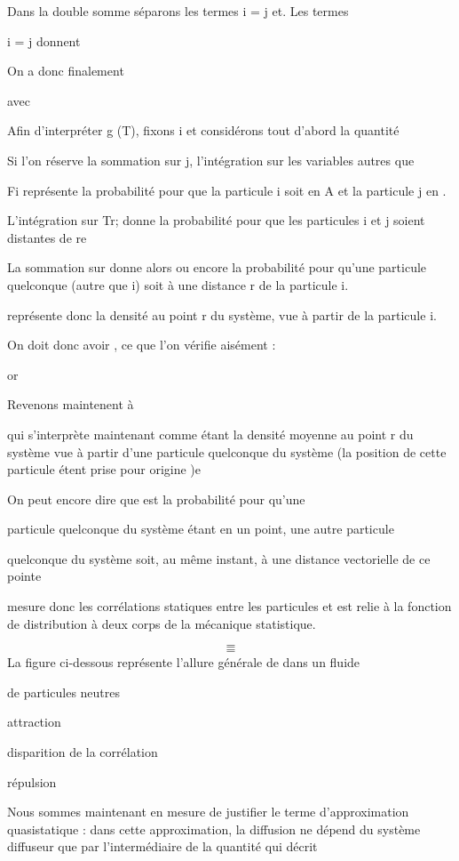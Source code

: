 Dans la double somme séparons les termes i = j et. Les termes

i = j donnent

On a donc finalement

avec

Afin d'interpréter g (T), fixons i et considérons tout d'abord la quantité

Si l'on réserve la sommation sur j, l'intégration sur les variables autres que

Fi représente la probabilité pour que la particule i soit en A et la particule
j en  .

L'intégration sur Tr; donne la probabilité pour que les particules
i et j soient distantes de re

La sommation sur  donne alors  ou encore la probabilité
pour qu'une particule quelconque (autre que i) soit à une distance r de la
particule i.


 représente donc la densité au point r du système, vue à partir de
la particule i.

On doit donc avoir , ce que l'on vérifie
aisément :

or

Revenons maintenent à 

qui s'interprète maintenant comme étant la densité moyenne au point r du
système vue à partir d'une particule quelconque du système (la position de
cette particule étent prise pour origine )e

On peut encore dire que  est la probabilité pour qu'une

particule quelconque du système étant en un point, une autre particule

quelconque du système soit, au même instant, à une distance vectorielle
de ce pointe

 mesure donc les corrélations statiques entre les particules et est relie
à la fonction de distribution à deux corps de la mécanique statistique.

\[
\tag{137}=
\]
\[
\tag{138}=
\]
La figure ci-dessous représente l'allure générale de  dans un fluide

de particules neutres

 attraction

disparition de la corrélation

 répulsion

Nous sommes maintenant en mesure de justifier le terme d'approximation
quasistatique : dans cette approximation, la diffusion ne dépend du système diffuseur
que par l'intermédiaire de la quantité  qui décrit

